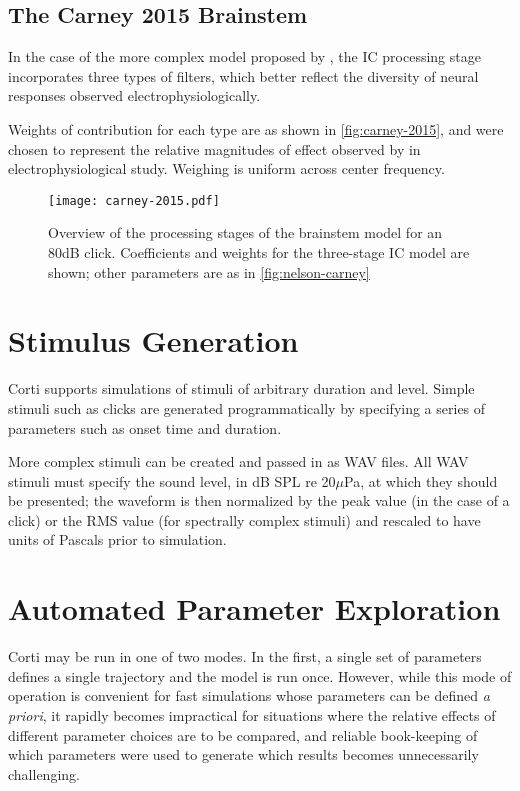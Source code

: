 \subsection{The Carney 2015 Brainstem} %
\label{sub:the_carney_2015_brainstem}
In the case of the more complex model proposed by \citeauthor{Carney2015Speech}, the IC processing stage incorporates three types of filters, which better reflect the diversity of neural responses observed electrophysiologically. 

Weights of contribution for each type are as shown in \autoref{fig:carney-2015}, and were chosen to represent the relative magnitudes of effect observed by \citeauthor{Carney2015Speech} in electrophysiological study.  Weighing is uniform across center frequency.

\begin{figure}[htbp]
	\centering
	\texttt{[image: carney-2015.pdf]}
	\caption[Overview of the Carney Midbrain and Brainstem]{Overview of the processing stages of the \citeauthor{Carney2015Speech} brainstem model for an 80dB click.  Coefficients and weights for the three-stage IC model are shown; other parameters are as in \autoref{fig:nelson-carney}}
	\label{fig:carney-2015}
\end{figure}


\section{Stimulus Generation} %
\label{sec:stimulus_generation}
Corti supports simulations of stimuli of arbitrary duration and level.  Simple stimuli such as clicks are generated programmatically by specifying a series of parameters such as onset time and duration.  

More complex stimuli can be created and passed in as WAV files.  All WAV stimuli must specify the sound level, in dB SPL re 20$\mu$Pa, at which they should be presented; the waveform is then normalized by the peak value (in the case of a click) or the RMS value (for spectrally complex stimuli) and rescaled to have units of Pascals prior to simulation.
\section{Automated Parameter Exploration} %
\label{sec:automated_parameter_exploration}
Corti may be run in one of two modes.  In the first, a single set of parameters defines a single trajectory and the model is run once.   However, while this mode of operation is convenient for fast simulations whose parameters can be defined \emph{a priori}, it rapidly becomes impractical for situations where the relative effects of different parameter choices are to be compared, and reliable book-keeping of which parameters were used to generate which results becomes unnecessarily challenging.

